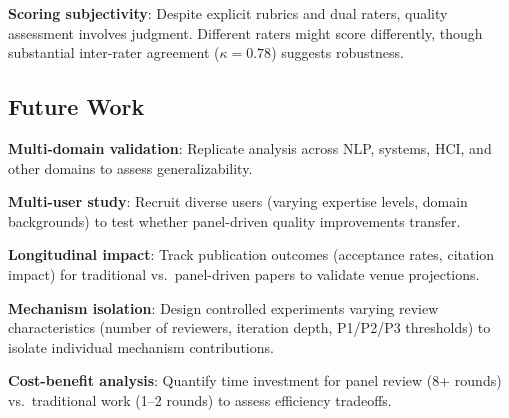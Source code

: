 \textbf{Scoring subjectivity}: Despite explicit rubrics and dual raters, quality assessment involves judgment. Different raters might score differently, though substantial inter-rater agreement ($\kappa = 0.78$) suggests robustness.

\subsection{Future Work}

\textbf{Multi-domain validation}: Replicate analysis across NLP, systems, HCI, and other domains to assess generalizability.

\textbf{Multi-user study}: Recruit diverse users (varying expertise levels, domain backgrounds) to test whether panel-driven quality improvements transfer.

\textbf{Longitudinal impact}: Track publication outcomes (acceptance rates, citation impact) for traditional vs.\ panel-driven papers to validate venue projections.

\textbf{Mechanism isolation}: Design controlled experiments varying review characteristics (number of reviewers, iteration depth, P1/P2/P3 thresholds) to isolate individual mechanism contributions.

\textbf{Cost-benefit analysis}: Quantify time investment for panel review (8+ rounds) vs.\ traditional work (1--2 rounds) to assess efficiency tradeoffs.
